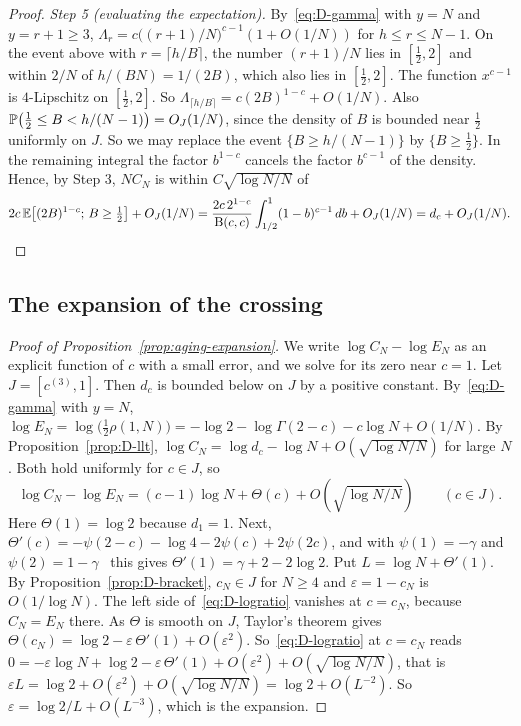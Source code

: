 \begin{proof}
\emph{Step 5 (evaluating the expectation).} By~\eqref{eq:D-gamma} with $y=N$
and $y=r+1\ge3$,
$\Lambda_r=c\bigl((r+1)/N\bigr)^{c-1}(1+O(1/N))$ for $h\le r\le N-1$. On the
event above with $r=\lceil h/B\rceil$, the number $(r+1)/N$ lies in
$[\frac12,2]$ and within $2/N$ of $h/(BN)=1/(2B)$, which also lies in
$[\frac12,2]$. The function $x^{c-1}$ is $4$-Lipschitz on $[\frac12,2]$. So
$\Lambda_{\lceil h/B\rceil}=c(2B)^{1-c}+O(1/N)$. Also
$\mathbb{P}\bigl(\frac12\le B<h/(N-1)\bigr)=O_J(1/N)$, since the density of $B$ is
bounded near $\frac12$ uniformly on $J$. So we may replace the event
$\{B\ge h/(N-1)\}$ by $\{B\ge\frac12\}$. In the remaining integral the factor
$b^{1-c}$ cancels the factor $b^{c-1}$ of the density. Hence, by Step 3,
$NC_N$ is within $C\sqrt{\log N/N}$ of
\[
2c\,\mathbb{E}\bigl[(2B)^{1-c};\,B\ge\tfrac12\bigr]+O_J(1/N)
=\frac{2c\,2^{1-c}}{\mathrm B(c,c)}\int_{1/2}^1(1-b)^{c-1}\,db+O_J(1/N)=d_c+O_J(1/N).\qedhere
\]
\end{proof}

\subsection{The expansion of the crossing}

\begin{proof}[Proof of Proposition~\ref{prop:aging-expansion}]
We write $\log C_N-\log E_N$ as an explicit function of $c$ with a small
error, and we solve for its zero near $c=1$. Let $J=[c^{(3)},1]$. Then $d_c$ is
bounded below on $J$ by a positive constant. By~\eqref{eq:D-gamma} with
$y=N$,
$\log E_N=\log\bigl(\tfrac12\rho(1,N)\bigr)=-\log2-\log\Gamma(2-c)-c\log N+O(1/N)$.
By Proposition~\ref{prop:D-llt},
$\log C_N=\log d_c-\log N+O(\sqrt{\log N/N})$ for large $N$. Both hold uniformly for
$c\in J$, so
\begin{equation}\label{eq:D-logratio}
\log C_N-\log E_N=(c-1)\log N+\Theta(c)+O(\sqrt{\log N/N})\qquad(c\in J).
\end{equation}
Here $\Theta(1)=\log2$ because $d_1=1$. Next,
$\Theta'(c)=-\psi(2-c)-\log4-2\psi(c)+2\psi(2c)$, and with $\psi(1)=-\gamma$
and $\psi(2)=1-\gamma$~\cite[5.4.12, 5.4.14]{dlmf} this gives
$\Theta'(1)=\gamma+2-2\log2$. Put
$L=\log N+\Theta'(1)$. By Proposition~\ref{prop:D-bracket}, $c_N\in J$ for
$N\ge4$ and $\varepsilon=1-c_N$ is $O(1/\log N)$. The left side
of~\eqref{eq:D-logratio} vanishes at $c=c_N$, because $C_N=E_N$ there. As
$\Theta$ is smooth on $J$, Taylor's theorem gives
$\Theta(c_N)=\log2-\varepsilon\,\Theta'(1)+O(\varepsilon^2)$.
So~\eqref{eq:D-logratio} at $c=c_N$ reads
$0=-\varepsilon\log N+\log2-\varepsilon\,\Theta'(1)+O(\varepsilon^2)+O(\sqrt{\log N/N})$,
that is
$\varepsilon L=\log2+O(\varepsilon^2)+O(\sqrt{\log N/N})=\log2+O(L^{-2})$. So
$\varepsilon=\log2/L+O(L^{-3})$, which is the expansion.
\end{proof}

